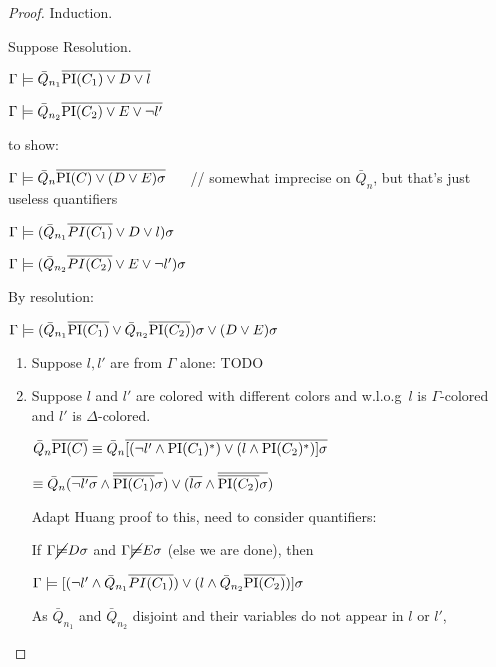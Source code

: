 \documentclass[,%
	paper=a4,%
	DIV14, 
	liststotoc,
	bibtotoc,
	draft=false,%
	numbers=noendperiod
]{scrartcl}
\begin{document}
\begin{proof}

	Induction.

	Suppose Resolution.
	\begin{prooftree}
	\end{prooftree}

	$\Gamma \entails \bar Q_{n_1} \overline{\PI(C_1)  \lor D \lor l}$

	$\Gamma \entails \bar Q_{n_2} \overline{\PI(C_2)  \lor E \lor \lnot l'}$

	to show:

	$\Gamma \entails \bar Q_n \overline {\PI(C) \lor (D \lor E)\sigma}$ $\quad$ // somewhat imprecise on $\bar Q_n$, but that's just useless quantifiers


	$\Gamma \entails ( \bar Q_{n_1} \overline{PI(C_1)}  \lor D \lor l )\sigma$

	$\Gamma \entails (\bar Q_{n_2} \overline{PI(C_2)}  \lor E \lor \lnot l')\sigma$

	By resolution:

	$\Gamma \entails (\bar Q_{n_1} \overline{\PI(C_1)}\lor \bar Q_{n_2} \overline{\PI(C_2)})\sigma  \lor (D \lor E )\sigma$


	\begin{enumerate}
		\item Suppose $l, l'$ are from $\Gamma$ alone:
			TODO


		\item Suppose $l$ and $l'$ are colored with different colors and w.l.o.g~$l$ is $\Gamma$-colored and $l'$ is $\Delta$-colored.

			$\bar Q_n \overline{\PI(C)} \equiv \bar Q_n  \overline{[ (\lnot l' \land \PI(C_1)^*) \lor (l \land \PI(C_2)^*) ] \sigma}$

			$\equiv \bar Q_n  (\overline{\lnot l'\sigma} \land \overline{\overline{\PI(C_1)}\sigma}) \lor (\overline{l\sigma} \land \overline{\overline{\PI(C_2)}\sigma})$

			Adapt Huang proof to this, need to consider quantifiers:

			If $\Gamma \cancel \entails D \sigma$ and 
			$\Gamma \cancel \entails E \sigma$ (else we are done), then  

			$\Gamma \entails [ (\lnot l' \land \bar Q_{n_1} \overline{PI(C_1)}) \lor (l \land \bar Q_{n_2} \overline{\PI(C_2)}) ] \sigma$

			As $\bar Q_{n_1}$ and $\bar Q_{n_2}$ disjoint and their variables do not appear in $l$ or $l'$,


\end{enumerate}
\end{proof}
\end{document}
